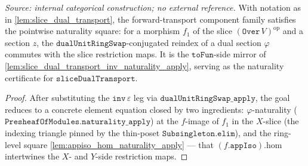\begin{lemma}\leanok
  \label{lem:slice_dual_transport_naturality_apply}
  \textit{Source: internal categorical construction; no external reference.}
  With notation as in \cref{lem:slice_dual_transport}, the forward-transport component family
  satisfies the pointwise naturality square: for a morphism \(f_1\) of the slice
  \((\mathtt{Over}\,V)^{\mathrm{op}}\) and a section \(z\), the \(\mathtt{dualUnitRingSwap}\)-conjugated
  reindex of a dual section \(\varphi\) commutes with the slice restriction maps. It is
  the \(\mathtt{toFun}\)-side mirror of \cref{lem:slice_dual_transport_inv_naturality_apply},
  serving as the naturality certificate for \(\mathtt{sliceDualTransport}\).
\end{lemma}
\begin{proof}
  \leanok
  After substituting the \(\mathtt{inv}\,\varepsilon\) leg via
  \(\mathtt{dualUnitRingSwap\_apply}\), the goal reduces to a concrete element equation closed by two
  ingredients: \(\varphi\)-naturality (\(\mathtt{PresheafOfModules.naturality\_apply}\)) at the
  \(f\)-image of \(f_1\) in the \(X\)-slice (the indexing triangle pinned by the thin-poset
  \(\mathtt{Subsingleton.elim}\)), and the ring-level square \cref{lem:appiso_hom_naturality_apply}
  --- that \((f.\mathtt{appIso}).\mathrm{hom}\) intertwines the \(X\)- and \(Y\)-side
  restriction maps.
\end{proof}

